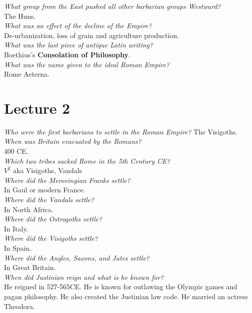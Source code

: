 \documentclass[12pt]{article}
\begin{document}
\textit{What group from the East pushed all other barbarian groups Westward?}\\
The Huns.\\

\textit{What was an effect of the decline of the Empire?}\\
De-urbanization, loss of grain and agriculture production.\\

\textit{What was the last piece of antique Latin writing?}\\
Boethius's \textbf{Consolation of Philosophy}.\\

\textit{What was the name given to the ideal Roman Empire?}\\
Rome Aeterna.

\section*{Lecture 2}
\setlength{\parindent}{0pt}

\textit{Who were the first barbarians to settle in the Roman Empire?}
The Visigoths.\\

\textit{When was Britain evacuated by the Romans?}\\
400 CE.\\

\textit{Which two tribes sacked Rome in the 5th Century CE?}\\
$V^{2}$ aka Visigoths, Vandals\\

\textit{Where did the Merovingian Franks settle?}\\
In Gaul or modern France.\\

\textit{Where did the Vandals settle?}\\
In North Africa.\\

\textit{Where did the Ostrogoths settle?}\\
In Italy.\\

\textit{Where did the Visigoths settle?}\\
In Spain.\\

\textit{Where did the Angles, Saxons, and Jutes settle?}\\
In Great Britain.\\

\textit{When did Justinian reign and what is he known for?}\\
He reigned in 527-565CE. He is known for outlawing the Olympic games and pagan philosophy. He also created the Justinian law code. He married an actress Theodora.\\
\end{document}

